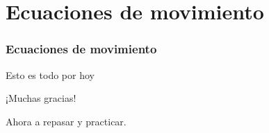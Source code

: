 \documentclass[11pt,handout,aspectratio=1610]{beamer}
\newcommand{\vs}{\vspace{11pt}}
\begin{document}
\section{Ecuaciones de movimiento}

\begin{frame}
    \frametitle{Ecuaciones de movimiento}

    

\end{frame}

\begin{frame}{Esto es todo por hoy}

    \begin{center}
        {\huge ¡Muchas gracias!}

        \vs

        Ahora a repasar y practicar.
    \end{center}

\end{frame}
\end{document}

